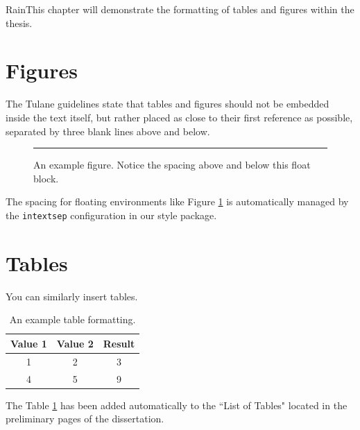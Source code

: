 RainThis chapter will demonstrate the formatting of tables and figures within the thesis.

\section{Figures}

The Tulane guidelines state that tables and figures should not be embedded inside the text itself, but rather placed as close to their first reference as possible, separated by three blank lines above and below.

\begin{figure}[H]
    \centering
    \rule{4cm}{4cm} %
    \caption{An example figure. Notice the spacing above and below this float block.}
    \label{fig:example_fig}
\end{figure}

The spacing for floating environments like Figure \ref{fig:example_fig} is automatically managed by the {\tt intextsep} configuration in our style package.

\section{Tables}

You can similarly insert tables.

\begin{table}[H]
    \centering
    \begin{tabular}{|c|c|c|}
        \hline
        \textbf{Value 1} & \textbf{Value 2} & \textbf{Result} \\
        \hline
        1                & 2                & 3               \\
        4                & 5                & 9               \\
        \hline
    \end{tabular}
    \caption{An example table formatting.}
    \label{tab:example_tab}
\end{table}

The Table \ref{tab:example_tab} has been added automatically to the ``List of Tables" located in the preliminary pages of the dissertation.
